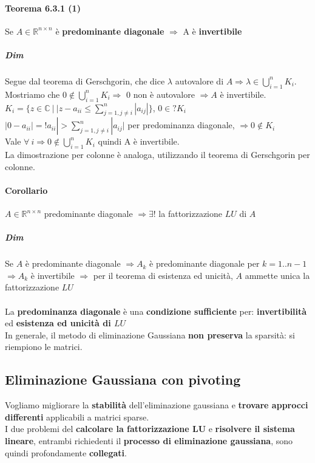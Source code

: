 \documentclass[10pt]{book}
\begin{document}
\paragraph{Teorema 6.3.1 (1)} Se $A \in \mathbb{R}^{n \times n}$ è \textbf{predominante diagonale} $\Rightarrow$ A è \textbf{invertibile}
\subparagraph{Dim} Segue dal teorema di Gerschgorin, che dice $\lambda$ autovalore di $A \Rightarrow \lambda \in \bigcup_{i=1}^n K_i$.\\
Mostriamo che $0 \not\in \bigcup_{i=1}^n K_i \Rightarrow$ 0 non è autovalore $\Rightarrow A$ è invertibile.\\
$K_i = \{ z \in \mathbb{C}\: |\: |z - a_{ii} \leq \sum_{j=1, j\neq i}^n |a_{ij}|\}$, $0 \in? K_i$\\
$|0 - a_{ii}| = !a_{ii}| > \sum_{j=1, j\neq i}^n |a_{ij}|$ per predominanza diagonale, $\Rightarrow 0 \not\in K_i$\\
Vale $\forall\: i \Rightarrow 0 \not\in \bigcup_{i=1}^n K_i$ quindi A è invertibile.\\
La dimostrazione per colonne è analoga, utilizzando il teorema di Gerschgorin per colonne.
\paragraph{Corollario} $A \in \mathbb{R}^{n \times n}$ predominante diagonale $\Rightarrow \exists!$ la fattorizzazione $LU$ di $A$
\subparagraph{Dim} Se $A$ è predominante diagonale $\Rightarrow A_k$ è predominante diagonale per $k = 1 .. n-1$\\
$\Rightarrow A_k$ è invertibile $\Rightarrow$ per il teorema di esistenza ed unicità, $A$ ammette unica la fattorizzazione $LU$
\paragraph{} La \textbf{predominanza diagonale} è una \textbf{condizione sufficiente} per: \textbf{invertibilità} ed \textbf{esistenza ed unicità di $LU$}\\
In generale, il metodo di eliminazione Gaussiana \textbf{non preserva} la sparsità: si riempiono le matrici.
\subsection{Eliminazione Gaussiana con pivoting}
Vogliamo migliorare la \textbf{stabilità} dell'eliminazione gaussiana e \textbf{trovare approcci differenti} applicabili a matrici sparse.\\
I due problemi del \textbf{calcolare la fattorizzazione LU} e \textbf{risolvere il sistema lineare}, entrambi richiedenti il \textbf{processo di eliminazione gaussiana}, sono quindi profondamente \textbf{collegati}.
\end{document}
